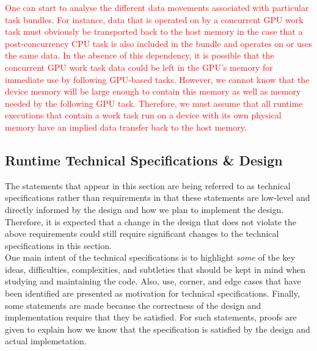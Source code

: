 \documentclass{article}
\begin{document}
\textcolor{red}{One can start to analyse the different data movements associated with particular
task bundles.  For instance, data that is operated on by a concurrent GPU work
task must obviously be transported back to the host memory in the case that a
post-concurrency CPU task is also included in the bundle and operates on or uses
the same data.  In the absence of this dependency, it is possible that the
concurrent GPU work task data could be left in the GPU's memory for immediate
use by following GPU-based tasks.  However, we cannot know that the device
memory will be large enough to contain this memory as well as memory needed by
the following GPU task.  Therefore, we must assume that all runtime executions
that contain a work task run on a device with its own physical memory have an
implied data transfer back to the host memory.}\\

\subsection{Runtime Technical Specifications \& Design}
The statements that appear in this section are being referred to as technical
specifications rather than requirements in that these statements are low-level
and directly informed by the design and how we plan to implement the design.
Therefore, it is expected that a change in the design that does not violate the
above requirements could still require significant changes to the technical
specifications in this section.\\

One main intent of the technical specifications is to highlight \textit{some} of
the key ideas, difficulties, complexities, and subtleties that should be kept in
mind when studying and maintaining the code.  Also, use, corner, and edge cases
that have been identified are presented as motivation for technical
specifications.  Finally, some statements are made because the correctness of
the design and implementation require that they be satisfied.  For such
statements, proofs are given to explain how we know that the specification is
satisfied by the design and actual implemetation.

\end{document}
